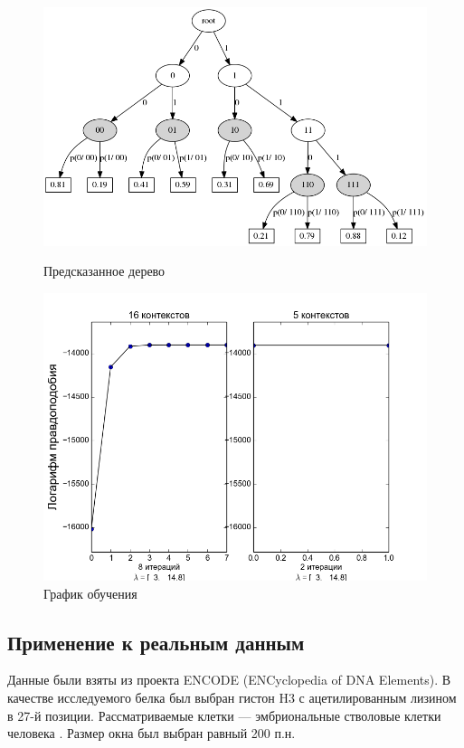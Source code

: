 \documentclass{matmex-diploma-custom}
\begin{document}
\begin{figure}[h!]
\begin{minipage}[b]{0.49 \textwidth}
\end{minipage}
\hfil \hfil%
\begin{minipage}[b]{0.49 \textwidth}
	\includegraphics[scale=0.3]{img/sample/predicted_trie.png}
	\centering
	\caption{ Предсказанное дерево }
	\label{ris:sample_predicted_trie}
\end{minipage}
\begin{minipage}[b]{0.8 \textwidth}
	\includegraphics[scale=0.4]{img/sample/plot_.png}
	\centering
	\caption{ График обучения }
	\label{ris:sample_log_likelihood}
\end{minipage}
\end{figure}

\subsection{Применение к реальным данным}
Данные были взяты из проекта ENCODE (ENCyclopedia of DNA Elements).
В качестве исследуемого белка был выбран гистон H3 с ацетилированным лизином в 27-й позиции. Рассматриваемые клетки --- эмбриональные стволовые клетки человека \cite{ENCODE}.
Размер окна был выбран равный 200 п.н.
\end{document}
